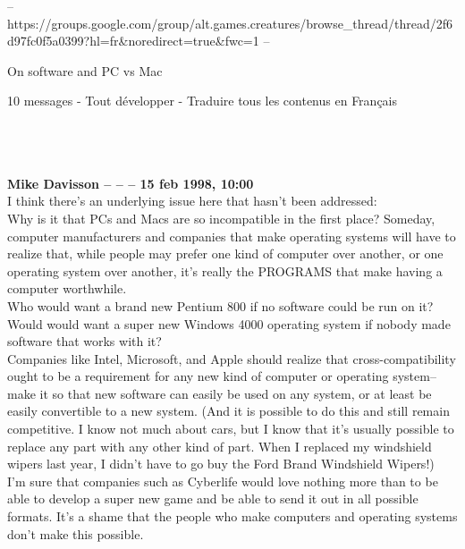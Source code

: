 \documentclass[11pt,twoside,a4paper]{article}
\title{\txtTITLE}
\date{ --- }
\begin{document}

\setlength\parindent{0pt} %

-- https://groups.google.com/group/alt.games.creatures/browse\_thread/thread/2f6d97fc0f5a0399?hl=fr\&noredirect=true\&fwc=1 --

\begin{multicols*}{2}
	\footnotesize
 

On software and PC vs Mac
		

	  	10 messages - Tout d{\'e}velopper  -  Traduire tous les contenus en Fran\c{c}ais 	
	
		
~\\ ~\\ ~\\ \textbf{Mike Davisson -- -- -- 15 feb 1998, 10:00}~\\

I think there's an underlying issue here that hasn't been addressed:~\\
Why is it that PCs and Macs are so incompatible in the first place? Someday, computer manufacturers and companies that make operating systems will have to realize that, while people may prefer one kind of computer over another, or one operating system over another, it's really the PROGRAMS that make having a computer worthwhile. ~\\
Who would want a brand new Pentium 800 if no software could be run on it? ~\\
Would would want a super new Windows 4000 operating system if nobody made software that works with it?~\\
Companies like Intel, Microsoft, and Apple should realize that cross-compatibility ought to be a requirement for any new kind of computer or operating system--make it so that new software can easily be used on any system, or at least be easily convertible to a new system.  (And it is possible to do this and still remain competitive.  I know not much about cars, but I know that it's usually possible to replace any part with any other kind of part. When I replaced my windshield wipers last year, I didn't have to go buy the Ford Brand Windshield Wipers!)~\\
I'm sure that companies such as Cyberlife would love nothing more than to be able to develop a super new game and be able to send it out in all possible formats.  It's a shame that the people who make computers and operating systems don't make this possible.~\\


\end{multicols*}
\end{document}
